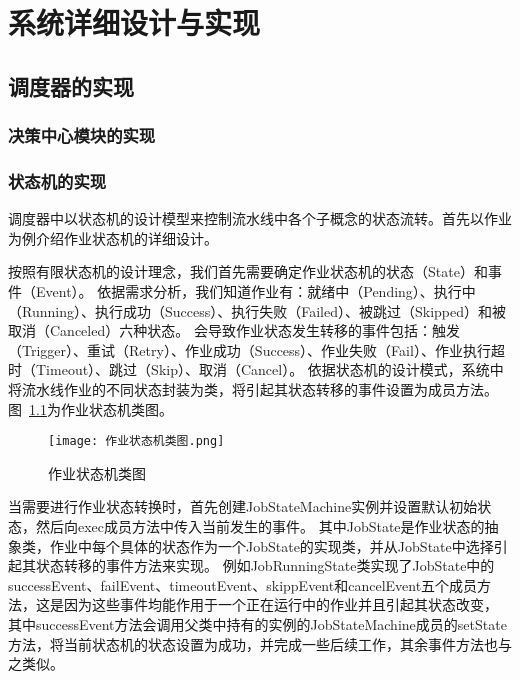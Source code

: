 
\chapter{系统详细设计与实现}

\section{调度器的实现}

\subsection{决策中心模块的实现}

\subsection{状态机的实现}
调度器中以状态机的设计模型来控制流水线中各个子概念的状态流转。首先以作业为例介绍作业状态机的详细设计。

按照有限状态机的设计理念，我们首先需要确定作业状态机的状态（State）和事件（Event）。
依据需求分析，我们知道作业有：就绪中（Pending）、执行中（Running）、执行成功（Success）、执行失败（Failed）、被跳过（Skipped）和被取消（Canceled）六种状态。
会导致作业状态发生转移的事件包括：触发（Trigger）、重试（Retry）、作业成功（Success）、作业失败（Fail）、作业执行超时（Timeout）、跳过（Skip）、取消（Cancel）。
依据状态机的设计模式，系统中将流水线作业的不同状态封装为类，将引起其状态转移的事件设置为成员方法。图~\ref{fig:作业状态机类图}为作业状态机类图。

\begin{figure}[h]
  \centering
  \texttt{[image: 作业状态机类图.png]}
  \caption{作业状态机类图}
  \label{fig:作业状态机类图}
\end{figure}

当需要进行作业状态转换时，首先创建JobStateMachine实例并设置默认初始状态，然后向exec成员方法中传入当前发生的事件。
其中JobState是作业状态的抽象类，作业中每个具体的状态作为一个JobState的实现类，并从JobState中选择引起其状态转移的事件方法来实现。
例如JobRunningState类实现了JobState中的successEvent、failEvent、timeoutEvent、skippEvent和cancelEvent五个成员方法，这是因为这些事件均能作用于一个正在运行中的作业并且引起其状态改变，
其中successEvent方法会调用父类中持有的实例的JobStateMachine成员的setState方法，将当前状态机的状态设置为成功，并完成一些后续工作，其余事件方法也与之类似。






